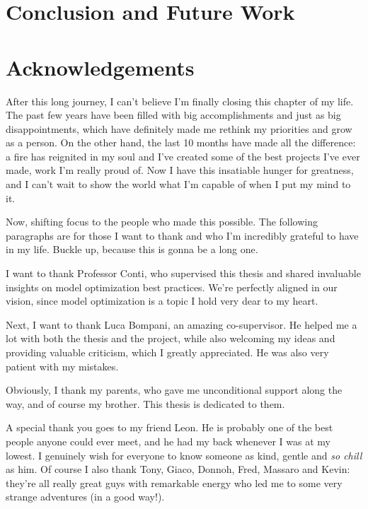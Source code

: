 \documentclass[12pt,a4paper,openright,twoside]{report}
\begin{document}
\chapter{Conclusion and Future Work}
\label{chap:conclusion}
\lhead[\fancyplain{}{\bfseries\thepage}]{\fancyplain{}{\bfseries\rightmark}}




\chapter*{Acknowledgements}
After this long journey, I can't believe I'm finally closing this chapter of my life. The past few years have been filled with big accomplishments and just as big disappointments, which have definitely made me rethink my priorities and grow as a person. On the other hand, the last 10 months have made all the difference: a fire has reignited in my soul and I've created some of the best projects I've ever made, work I'm really proud of. Now I have this insatiable hunger for greatness, and I can't wait to show the world what I'm capable of when I put my mind to it.

Now, shifting focus to the people who made this possible. The following paragraphs are for those I want to thank and who I'm incredibly grateful to have in my life. Buckle up, because this is gonna be a long one.

I want to thank Professor Conti, who supervised this thesis and shared invaluable insights on model optimization best practices. We're perfectly aligned in our vision, since model optimization is a topic I hold very dear to my heart.

Next, I want to thank Luca Bompani, an amazing co-supervisor. He helped me a lot with both the thesis and the project, while also welcoming my ideas and providing valuable criticism, which I greatly appreciated. He was also very patient with my mistakes.

Obviously, I thank my parents, who gave me unconditional support along the way, and of course my brother. This thesis is dedicated to them.

A special thank you goes to my friend Leon. He is probably one of the best people anyone could ever meet, and he had my back whenever I was at my lowest. I genuinely wish for everyone to know someone as kind, gentle and \textit{so chill} as him. Of course I also thank Tony, Giaco, Donnoh, Fred, Massaro and Kevin: they're all really great guys with remarkable energy who led me to some very strange adventures (in a good way!).
\end{document}
